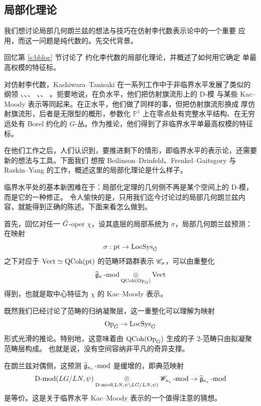 \subsection{局部化理论}
	\label{ss:locaff}
	\ssszh 我们想讨论局部几何朗兰兹的想法与技巧在仿射李代数表示论中的一个重要
	应用，而这一问题是纯代数的。先交代背景。

	\ssszh 回忆第 \ref{s:bbloc} 节讨论了
	约化李代数的局部化理论，并概述了如何用它确定
	单最高权模的特征标。

	对仿射李代数，Kashiwara--Tanisaki 在一系列工作中于非临界水平发展了类似的纲领
	\cite{kashiwara90}、\cite{kashiwaratanisakiposlevelii}、\cite{kashiwaratanisakinegativeintegrallevel}、
	\cite{kashiwaratanisakinegativerationallevel}、\cite{kashiwaratanisakipositiverational}、
	\cite{kashiwaratanisakialllevels}。扼要地说，在负水平，他们把仿射旗流形上的 D-模
	与某些 Kac--Moody 表示等同起来。在正水平，他们做了同样的事，但把仿射旗流形换成
	厚仿射旗流形，后者是无限型的概形，参数化 $\mathbb{P}^1$ 上在零点处有完整水平结构、在无穷远处有 Borel
	约化的 $G$-丛。作为推论，他们得到了非临界水平单最高权模的特征标。

	在他们工作之后，人们认识到，要推进剩下的情形，即临界水平的表示论，还需要新的想法与工具。下面我们
	想按 Beilinson--Drinfeld、Frenkel--Gaitsgory 与 Raskin--Yang 的工作，概述这里的局部化理论是什么样子。

	\ssszh 临界水平处的基本新困难在于：局部化定理的几何侧不再是某个空间上的 D-模，而是它的一种修正。
	令人愉快的是，只用我们迄今讨论过的局部几何朗兰兹内容，就能得到正确的陈述。下面来看怎么做到。

	首先，回忆对任一 $\check{G}$-oper $\chi$，设其底层的局部系统为 $\sigma$，局部几何朗兰兹预测：在映射
	\[
	  \sigma: \operatorname{pt} \rightarrow \operatorname{LocSys}_{\check{G}}
	\]
	之下对应于 $\operatorname{Vect} \simeq \operatorname{QCoh}(\operatorname{pt})$ 的范畴环路群表示 $\mathscr{C}_{\sigma}$，可以由重整化
	\[
	  \widehat{\mathfrak{g}}_\kappa\operatorname{-mod} \underset{\operatorname{QCoh}(\mathrm{Op}_{\check{G}})} \otimes \operatorname{Vect}
	\]
	得到，也就是取中心特征为 $\chi$ 的 Kac--Moody 表示。

   \begin{re} 既然我们已经讨论了范畴的归纳凝聚层，这一重整化可以理解为映射
   \[
   \mathrm{Op}_{\check{G}} \rightarrow \operatorname{LocSys}_{\check{G}}
   \]
   形式光滑的推论。特别地，这意味着由 $\operatorname{QCoh}(\mathrm{Op}_{\check{G}})$ 生成的子 2-范畴只由拟凝聚范畴层构成。
   也就是说，没有空间容纳非平凡的奇异支撑。

   在朗兰兹对偶侧，这预测 $\widehat{\mathfrak{g}}_{\kappa_c}\operatorname{-mod}$ 是缓增的，即典范映射
   \[
        \operatorname{D-mod}(LG/ LN, \psi ) \underset {\operatorname{D-mod}(LN, \psi \backslash LG / LN,
        \psi)} \otimes \mathscr{W}_{\kappa_c}\operatorname{-mod} \rightarrow \widehat{\mathfrak{g}}_{\kappa_c}\operatorname{-mod}
   \]
   是等价。这是关于临界水平 Kac--Moody 表示的一个值得注意的猜想。
   \end{re}

